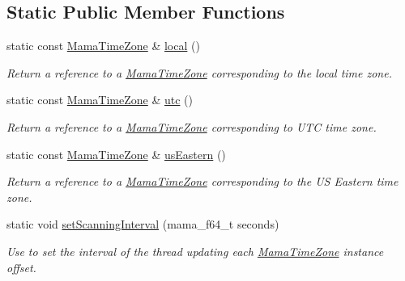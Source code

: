 \subsection*{Static Public Member Functions}
\begin{DoxyCompactItemize}
\item 
static const \hyperlink{classWombat_1_1MamaTimeZone}{MamaTimeZone} \& \hyperlink{classWombat_1_1MamaTimeZone_ae0e145bc9434a5c7ab3028be41327bb3}{local} ()
\begin{DoxyCompactList}\small\item\em Return a reference to a \hyperlink{classWombat_1_1MamaTimeZone}{MamaTimeZone} corresponding to the local time zone. \item\end{DoxyCompactList}\item 
static const \hyperlink{classWombat_1_1MamaTimeZone}{MamaTimeZone} \& \hyperlink{classWombat_1_1MamaTimeZone_a98528db714ffcb96f44c25ea2d41ca3a}{utc} ()
\begin{DoxyCompactList}\small\item\em Return a reference to a \hyperlink{classWombat_1_1MamaTimeZone}{MamaTimeZone} corresponding to UTC time zone. \item\end{DoxyCompactList}\item 
static const \hyperlink{classWombat_1_1MamaTimeZone}{MamaTimeZone} \& \hyperlink{classWombat_1_1MamaTimeZone_adb315698d116e1cd88897ed08ffa5d27}{usEastern} ()
\begin{DoxyCompactList}\small\item\em Return a reference to a \hyperlink{classWombat_1_1MamaTimeZone}{MamaTimeZone} corresponding to the US Eastern time zone. \item\end{DoxyCompactList}\item 
static void \hyperlink{classWombat_1_1MamaTimeZone_aaf9aac46af8f7ed2ae85d3476fd7975f}{setScanningInterval} (mama\_\-f64\_\-t seconds)
\begin{DoxyCompactList}\small\item\em Use to set the interval of the thread updating each \hyperlink{classWombat_1_1MamaTimeZone}{MamaTimeZone} instance offset. \item\end{DoxyCompactList}\end{DoxyCompactItemize}


